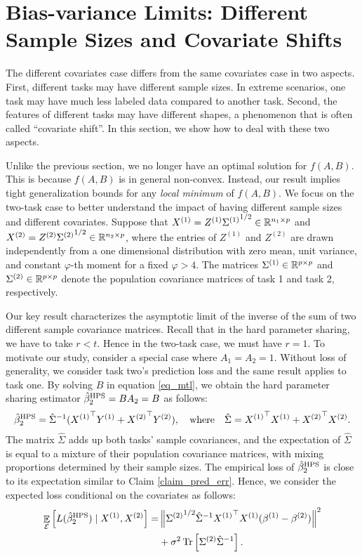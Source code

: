 \section{Bias-variance Limits: Different Sample Sizes and Covariate Shifts}\label{sec_diff}

The different covariates case differs from the same covariates case in two aspects.
First, different tasks may have different sample sizes. In extreme scenarios, one task may have much less labeled data compared to another task.
Second, the features of different tasks may have different shapes, a phenomenon that is often called ``covariate shift''.
In this section, we show how to deal with these two aspects.

Unlike the previous section, we no longer have an optimal solution for $f(A, B)$.
This is because $f(A, B)$ is in general non-convex.
Instead, our result implies tight generalization bounds for any \emph{local minimum} of $f(A, B)$.
We focus on the two-task case to better understand the impact of having different sample sizes and different covariates.
Suppose that $X^{(1)} = Z^{(1)}{\Sigma^{(1)}}^{1/2} \in \mathbb{R}^{n_1 \times p}$ and $X^{(2)} = Z^{(2)}{\Sigma^{(2)}}^{1/2} \in \mathbb{R}^{n_2 \times p}$, where the entries of $Z^{(1)}$ and $ Z^{(2)}$ are drawn independently from a one dimensional distribution with zero mean, unit variance, and constant $\varphi$-th moment for a fixed $\varphi > 4$. The matrices $\Sigma^{(1)}\in \mathbb{R}^{p\times p}$ and $\Sigma^{(2)}\in \mathbb{R}^{p\times p}$ denote the population covariance matrices of task 1 and task 2, respectively.

Our key result characterizes the asymptotic limit of the inverse of the sum of two different sample covariance matrices. Recall that in the hard parameter sharing, we have to take $r<t$. Hence in the two-task case, we must have $r=1$. 
To motivate our study, consider a special case where $A_1=A_2=1$. 
Without loss of generality, we consider task two's prediction loss and the same result applies to task one.
By solving $B$ in equation \eqref{eq_mtl}, we obtain the hard parameter sharing estimator $\hat{\beta}_2^{\textup{HPS}} = B A_2 = B$ as follows:
\begin{align}\label{def hatsig}
	\hat{\beta}_2^{\textup{HPS}} = {\hat{\Sigma}}^{-1} ({X^{(1)}}^{\top} Y^{(1)} + {X^{(2)}}^{\top} Y^{(2)}), \ \ \text{ where } \ \ \hat{\Sigma} = {X^{(1)}}^{\top} X^{(1)} + {X^{(2)}}^{\top} X^{(2)}.
\end{align}
The matrix $\hat{\Sigma}$ adds up both tasks' sample covariances, and the expectation of $\hat{\Sigma}$ is equal to a mixture of their population covariance matrices, with mixing proportions determined by their sample sizes.
The empirical loss of $\hat{\beta}_2^{\textup{HPS}}$ is close to its expectation similar to Claim \ref{claim_pred_err}.
Hence, we consider the expected loss conditional on the covariates as follows:
\begin{align}
	\mathop{\mathbb{E}}_{\mathcal{E}}\left[ L(\hat{\beta}_2^{\textup{HPS}}) \mid X^{(1)}, X^{(2)} \right] =
	& \left\| {\Sigma^{(2)}}^{1/2} \hat{\Sigma}^{-1} {X^{(1)}}^{\top} X^{(1)} (\beta^{(1)} - \beta^{(2)}) \right\|^2 \label{eq_bias_2task} \\
	& + \sigma^2 \operatorname{Tr}\left[\Sigma^{(2)}\hat{\Sigma}^{-1}\right]. \label{eq_variance_2task}
\end{align}

